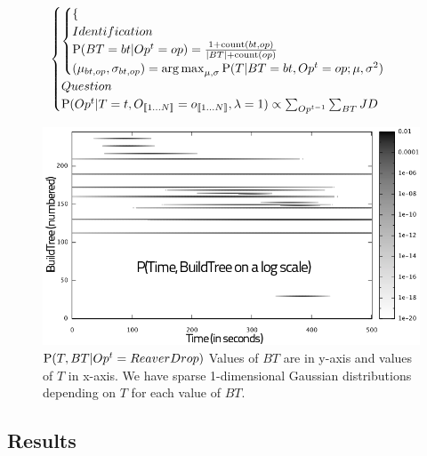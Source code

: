 \begin{eqnarray*}
\begin{cases}
\begin{cases}
\begin{cases}
        \end{cases}\\
    Identification\\
            \mathrm{P}(BT=bt | Op^t=op) = \frac{1 + \mathrm{count}(bt,op)}{\left\lvert BT\right\rvert + \mathrm{count}(op)}\\
            (\mu_{bt,op},\sigma_{bt,op}) = \operatorname*{arg\,max}_{\mu,\sigma}\mathrm{P}(T|BT=bt, Op^t=op; \mu,\sigma^2)\\
    \end{cases}\\
Question \\
 \mathrm{P}(Op^t|T=t, O_{\llbracket 1\dots N\rrbracket}=o_{\llbracket 1\dots N\rrbracket}, \lambda = 1) \propto \sum_{Op^{t-1}}\sum_{BT} JD \\
\end{cases}
\end{eqnarray*}

\begin{figure}
\centerline{\includegraphics[width=0.82\columnwidth]{images/BW_HeatMap_knowing_ReaverDrop.png}}
\caption{$\mathrm{P}(T, BT | Op^t=ReaverDrop)$ Values of $BT$ are in y-axis and values of $T$ in x-axis. We have sparse 1-dimensional Gaussian distributions depending on $T$ for each value of $BT$.}
\label{fig:sparseBTOp}
\end{figure}

\subsection{Results}

